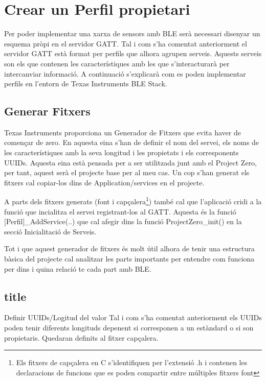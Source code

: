 \section{Crear un Perfil propietari}

Per poder implementar una xarxa de sensors amb BLE serà necessari disenyar un esquema pròpi en el servidor GATT.
Tal i com s'ha comentat anteriorment el servidor GATT està format per perfils que alhora agrupen serveis.
Aquests serveis son els que contenen les característiques amb les que s'interacturarà per intercanviar informació.
A continuació s'explicarà com es poden implementar perfils en l'entorn de Texas Instruments BLE Stack.

\subsection{Generar Fitxers}
Texas Instruments proporciona un Generador de Fitxers \cite{Service_Generator} que evita haver de començar de zero.
En aquesta eina s'han de definir el nom del servei, els noms de les característiques amb la seva longitud i les propietats i els corresponents UUIDs.
Aquesta eina està pensada per a ser utilitzada junt amb el Project Zero, per tant, aquest serà el projecte base per al meu cas.
Un cop s'han generat els fitxers cal copiar-los dins de Application/services en el projecte.

A parts dels fitxers generats (font i capçalera\footnote{Els fitxers de capçalera en C s'identifiquen per l'extensió .h i contenen les declaracions de funcions que es poden compartir entre múltiples fitxers font}) també cal que l'aplicació cridi a la funció que incialitza el servei registrant-los al GATT.
Aquesta és la funció [Perfil]\_AddService(..) que cal afegir dins la funció ProjectZero\_init() en la secció Inicialitació de Serveis.

Tot i que aquest generador de fitxers és molt útil alhora de tenir una estructura bàsica del projecte cal analitzar les parts importants per entendre com funciona per dins i quina relació te cada part amb BLE.

\subsection{title}

Definir UUIDs/Logitud del valor
Tal i com s'ha comentat anteriorment els UUIDs poden tenir diferents longituds depenent si corresponen a un estàndard o si son propietaris.
Quedaran definits al fitxer capçalera.

